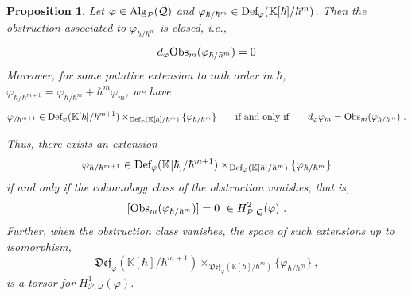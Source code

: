 \documentclass[11pt]{amsart}
\numberwithin{equation}{section}
\newtheorem{prop}[theo]{Proposition}
\theoremstyle{definition}
\newcommand{\bb}{\mathbb}
\newcommand{\mc}{\mathcal}
\newcommand{\Def}{{\textup{Def}}}
\newcommand{\fDef}{{\mathfrak{Def}}}
\newcommand{\K}{{\bb K}}
\newcommand{\Obs}{{\textup{Obs}}}
\newcommand{\Alg}{{\textup{Alg}}}
\newcommand{\0}{{\textbf{0}}}
\def \ie{{\it i.e.}}
\begin{document}
\begin{prop}\label{DefObsprop} 
Let $\varphi \in \Alg_{\mc P}(\mc Q)$ and $\varphi_{\hbar/\hbar^{m}}\in \Def_\varphi( \K[\hbar]/\hbar^{m})$. Then the obstruction associated to $\varphi_{\hbar/\hbar^m}$ is closed, \ie,
\[
d_\varphi \Obs_m(\varphi_{\hbar/\hbar^m}) =0 
\]
Moreover, for some putative extension to $m$th order in $\hbar$, $\varphi_{\hbar/\hbar^{m+1}} = \varphi_{\hbar/\hbar^m}+ \hbar^m \varphi_m$, we have 
\[ 
\varphi_{ / \hbar^{m+1}} \in \Def_\varphi(\K[\hbar]/\hbar^{m+1}) \times_{\Def_\varphi(\K[\hbar]/\hbar^{m}) } \{\varphi_{\hbar/\hbar^{m}} \} \qquad\text{if and only if} \qquad d_\varphi \varphi_m = \Obs_m(\varphi_{\hbar/\hbar^{m}})  \ .
\]


Thus, there exists an extension
\[ \varphi_{ \hbar/ \hbar^{m+1}} \in \Def_\varphi(\K[\hbar]/\hbar^{m+1}) \times_{\Def_\varphi(\K[\hbar]/\hbar^{m}) } \{\varphi_{\hbar/\hbar^{m}} \} \]
if and only if the cohomology class of the obstruction vanishes, that is,
\[ [ \Obs_m(\varphi_{\hbar/\hbar^{m}})]= 0 \ \in H^2_{\mc P,\mc Q}(\varphi)\ .\]
Further, when the obstruction class vanishes, the space of such extensions up to isomorphism,
\[  \fDef_\varphi(\K[\hbar]/\hbar^{m+1}) \times_{\fDef_\varphi(\K[\hbar]/\hbar^{m}) } \{\varphi_{\hbar/\hbar^{m}} \} \ , \]
is a torsor for $H^1_{\mc P,\mc Q}(\varphi)$.
\end{prop}
\end{document}
